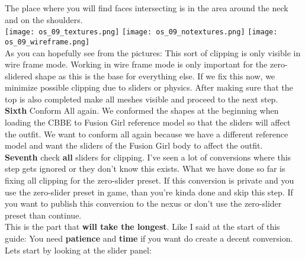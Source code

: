 The place where you will find faces intersecting is in the area around the neck and on the shoulders.\\
\texttt{[image: os\_09\_textures.png]}
\texttt{[image: os\_09\_notextures.png]}
\texttt{[image: os\_09\_wireframe.png]}\\
As you can hopefully see from the pictures: This sort of clipping is only visible in wire frame mode. Working in wire frame mode is 
only important for the zero-slidered shape as this is the base for everything else. If we fix this now, we minimize possible 
clipping due to sliders or physics. After making sure that the top is also completed make all meshes visible and proceed to the next step.\\
\textbf{Sixth} Conform All again. We conformed the shapes at the beginning when loading the CBBE to Fusion Girl reference model so that 
the sliders will affect the outfit. We want to conform all again because we have a different reference model and want the sliders of 
the Fusion Girl body to affect the outfit.\\
\textbf{Seventh} check \textbf{all} sliders for clipping. I've seen a lot of conversions where this step gets ignored or they don't know 
this exists. What we have done so far is fixing all clipping for the zero-slider preset. If this conversion is private and you use 
the zero-slider preset in game, than you're kinda done and skip this step. If you want to publish this conversion to the nexus or don't 
use the zero-slider preset than continue.\\
This is the part that \textbf{will take the longest}. Like I said at the start of this guide: You need \textbf{patience} and \textbf{time} 
if you want do create a decent conversion. Lets start by looking at the slider panel:

